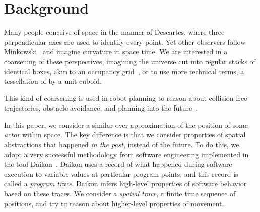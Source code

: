 \section{Background}
\label{sec:background}

Many people conceive of space in the manner of Descartes, where three perpendicular axes are used to identify every point.  
Yet other observers follow Minkowski~\cite{minkowski1952space} and imagine curvature in space time.
We are interested in a coarsening of these perspectives, imagining the universe cut into regular stacks of identical boxes, akin to an occupancy grid~\cite{moravec1985high}, or to use more technical terms, a tessellation of \rthree by a unit cuboid.



This kind of coarsening is used in robot planning to reason about collision-free trajectories, obstacle avoidance, and planning into the future~\cite{siegwart2011introduction}.

In this paper, we consider a similar over-approximation of the position of some \emph{actor} within space. 
The key difference is that we consider properties of spatial abstractions that happened \emph{in the past}, instead of the future.
To do this, we adopt a very successful methodology from software engineering implemented in the tool Daikon~\cite{kataoka2001automated}.
Daikon uses a record of what happened during software execution to variable values at particular program points, and this record is called a \emph{program trace}.  Daikon infers high-level properties of software behavior based on these traces.
We consider a \emph{spatial trace}, a finite time sequence of positions, and try to reason about higher-level properties of movement.


